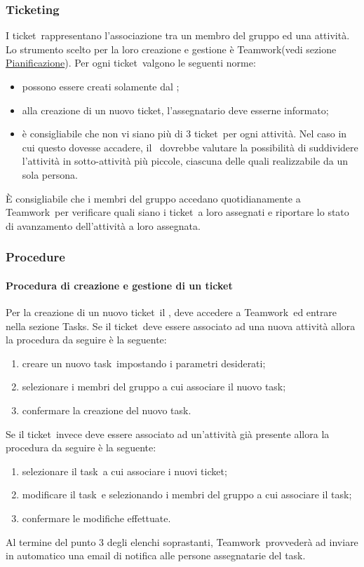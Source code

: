 \documentclass[../NormeProgetto.tex]{subfiles}
\begin{document}
	\subsubsection{Ticketing}
			I ticket\g\ rappresentano l'associazione tra un membro del gruppo ed una attività. Lo strumento scelto per la loro creazione e gestione è Teamwork\g (vedi sezione \hyperref[sec: Pianificazione Teamwork]{Pianificazione}). Per ogni ticket\g\ valgono le seguenti norme:
			\begin{itemize}
				\item possono essere creati solamente dal \responsabilediprogetto;
				\item alla creazione di un nuovo ticket\g, l'assegnatario deve esserne informato;
				\item è consigliabile che non vi siano più di 3 ticket\g\ per ogni attività. Nel caso in cui questo dovesse accadere, il \responsabilediprogetto\ dovrebbe valutare la possibilità di suddividere l'attività in sotto-attività più piccole, ciascuna delle quali realizzabile da un sola persona.
			\end{itemize}			 
			 È consigliabile che i membri del gruppo accedano quotidianamente a Teamwork\g\ per verificare quali siano i ticket\g\ a loro assegnati e riportare lo stato di avanzamento dell'attività a loro assegnata.

		\subsubsection{Procedure}
			\paragraph{Procedura di creazione e gestione di un ticket}
				Per la creazione di un nuovo ticket\g\ il \responsabilediprogetto, deve accedere a Teamwork\g\ ed entrare nella sezione Tasks. Se il ticket\g\ deve essere associato ad una nuova attività allora la procedura da seguire è la seguente:
				\begin{enumerate}
					\item creare un nuovo task\g\ impostando i parametri desiderati;
					\item selezionare i membri del gruppo a cui associare il nuovo task\g;
					\item confermare la creazione del nuovo task\g.
				\end{enumerate}
				Se il ticket\g\ invece deve essere associato ad un'attività già presente allora la procedura da seguire è la seguente:
				\begin{enumerate}
					\item selezionare il task\g\ a cui associare i nuovi ticket\g;
					\item modificare il task\g\ e selezionando i membri del gruppo a cui associare il task\g;
					\item confermare le modifiche effettuate.
				\end{enumerate}
				Al termine del punto 3 degli elenchi soprastanti, Teamwork\g\ provvederà ad inviare in automatico una email di notifica alle persone assegnatarie del task\g.
				
\end{document}
